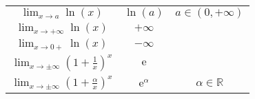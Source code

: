 \begin{minipage}{\linewidth}
\begin{tabular}{|c|c|c|}
        $\displaystyle\lim_{x\to a} \ln(x)$                                   & $\ln(a)$                                                                               & $a \in (0, +\infty)$                                                  \\
        $\displaystyle\lim_{x\to +\infty} \ln(x)$                             & $+\infty$                                                                              &                                                                       \\
        $\displaystyle\lim_{x\to0+} \ln(x)$                                   & $-\infty$                                                                              &                                                                       \\
        $\displaystyle\lim_{x\to\pm\infty} \left(1 + \frac{1}{x}\right)^x$    & $\mathrm{e}$                                                                           &                                                                       \\
        $\displaystyle\lim_{x\to\pm\infty} \left(1+\frac{\alpha}{x}\right)^x$ & $\mathrm{e}^\alpha$                                                                    & $\alpha \in \mathbb{R}$                                               \\
        \hline
    \end{tabular}

\end{minipage}

\vspace{1em}


